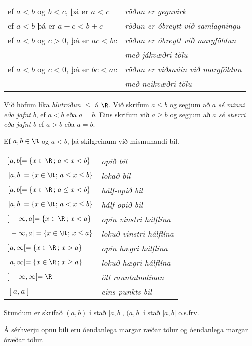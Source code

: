 \begin{center}
\begin{tabular}{ll}
ef $a<b$ og $b<c$, þá er $a<c$ &{\it röðun er gegnvirk}\\ 
ef $a<b$ þá er $a+c<b+c$&{\it röðun er óbreytt við samlagningu}\\
ef $a<b$ og $c>0$, þá er $ac<bc$&{\it röðun er óbreytt við
margföldun}\\ 
&{\it með jákvæðri tölu}\\
ef $a<b$ og $c<0$, þá er $bc<ac$&{\it röðun er viðsnúin við
margföldun}\\
& {\it með neikvæðri tölu}\\
\end{tabular}
\end{center}

Við höfum líka {\it hlutröðun $ \leq $} á $\R$.  Við skrifum 
$a\leq b$ og segjum að $a$ {\it sé minni eða jafnt} $b$, ef
$a<b$ eða $a=b$.   Eins skrifum við $a\geq b$ og segjum að 
{\it $a$ sé stærri eða jafnt $b$} ef $a>b$ eða $a=b$.  

Ef $a,b\in \R$ og $a<b$,  þá skilgreinum við mismunandi bil.
\begin{center}
\begin{tabular}{ll}
$]a,b[=\{x\in \R\,;\, a<x<b\}$ \qquad  &{\it opið bil}\\
$[a,b]=\{x\in \R\,;\, a\leq x\leq b\}$ \qquad  &{\it lokað bil}\\
$[a,b[=\{x\in \R\,;\, a\leq x<b\}$ \qquad  &{\it hálf-opið bil}\\
$]a,b]=\{x\in \R\,;\, a<x\leq b\}$ \qquad  &{\it hálf-opið bil}\\
$]-\infty,a[=\{x\in \R\,;\, x<a\}$ \qquad  &{\it opin vinstri hálflína}\\
$]-\infty,a]=\{x\in \R\,;\, x\leq a\}$ \qquad  &{\it lokuð vinstri hálflína}\\
$]a,\infty[=\{x\in \R\,;\, x>a\}$ \qquad  &{\it opin hægri hálflína}\\
$[a,\infty[=\{x\in \R\,;\, x\geq a\}$ \qquad  &{\it lokuð hægri hálflína}\\
$]-\infty,\infty[=\R$\qquad &{\it öll rauntalnalínan}\\
$[a,a]$\qquad &{\it eins punkts bil}
\end{tabular}
\end{center}
Stundum er skrifað $(a,b)$ í stað $]a,b[$,  $(a,b]$ í stað
$]a,b]$ o.s.frv.

Á sérhverju opnu bili eru óendanlega margar ræðar tölur og óendanlega
margar óræðar tölur.

